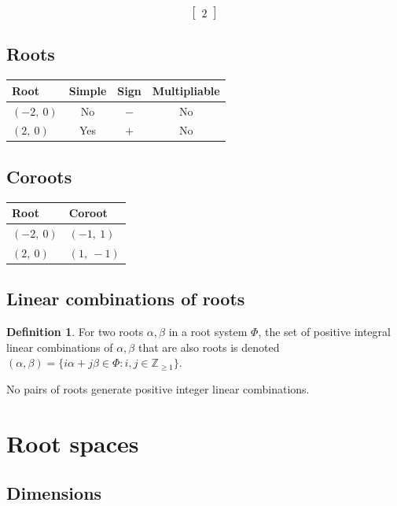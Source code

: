 \documentclass[11pt]{article}
\theoremstyle{definition}
\newtheorem{definition}{Definition}[section]
\begin{document}
\[
\left[\begin{matrix}2\end{matrix}\right]
\]

\subsection{Roots}

\begin{tabular}{|l|c|c|c|}
    \hline
    \textbf{Root} & \textbf{Simple} & \textbf{Sign} & \textbf{Multipliable} \\
    \hline
    $\left( -2, \  0\right)$ & No & $-$ & No \\
    \hline
    $\left( 2, \  0\right)$ & Yes & $+$ & No \\
    \hline
\end{tabular}


\subsection{Coroots}

\begin{tabular}{|l|l|}
    \hline
    \textbf{Root} & \textbf{Coroot} \\
    \hline
    $\left( -2, \  0\right)$ & $\left( -1, \  1\right)$ \\
    \hline
    $\left( 2, \  0\right)$ & $\left( 1, \  -1\right)$ \\
    \hline
\end{tabular}


\subsection{Linear combinations of roots}

\begin{definition}
For two roots $\alpha, \beta$ in a root system $\Phi$, the set of positive integral linear combinations of $\alpha, \beta$ that are also roots is denoted
\(
	(\alpha, \beta) = \{ i \alpha + j \beta \in \Phi : i, j \in \mathbb{Z}_{\ge 1} \}
\).
\end{definition}

\noindent No pairs of roots generate positive integer linear combinations.


\newpage
\section{Root spaces}

\subsection{Dimensions}
\end{document}
